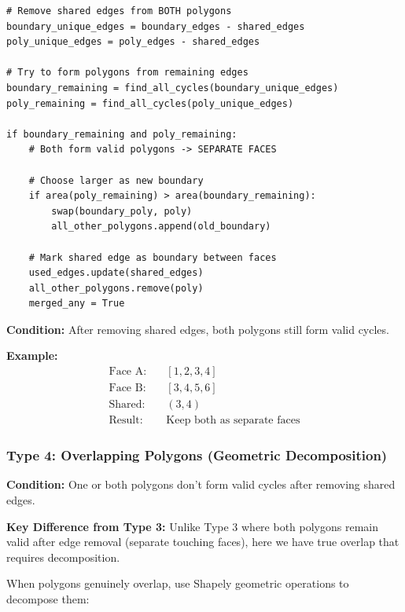 \documentclass[11pt]{article}
\begin{document}
\begin{lstlisting}[caption={Two faces sharing an edge},label={lst:touching}]
# Remove shared edges from BOTH polygons
boundary_unique_edges = boundary_edges - shared_edges
poly_unique_edges = poly_edges - shared_edges

# Try to form polygons from remaining edges
boundary_remaining = find_all_cycles(boundary_unique_edges)
poly_remaining = find_all_cycles(poly_unique_edges)

if boundary_remaining and poly_remaining:
    # Both form valid polygons -> SEPARATE FACES
    
    # Choose larger as new boundary
    if area(poly_remaining) > area(boundary_remaining):
        swap(boundary_poly, poly)
        all_other_polygons.append(old_boundary)
    
    # Mark shared edge as boundary between faces
    used_edges.update(shared_edges)
    all_other_polygons.remove(poly)
    merged_any = True
\end{lstlisting}

\textbf{Condition:} After removing shared edges, both polygons still form valid cycles.

\textbf{Example:}
\begin{align*}
\text{Face A:} &\quad [1,2,3,4] \\
\text{Face B:} &\quad [3,4,5,6] \\
\text{Shared:} &\quad (3,4) \\
\text{Result:} &\quad \text{Keep both as separate faces}
\end{align*}

\subsubsection{Type 4: Overlapping Polygons (Geometric Decomposition)}

\textbf{Condition:} One or both polygons don't form valid cycles after removing shared edges.

\textbf{Key Difference from Type 3:} Unlike Type 3 where both polygons remain valid after edge removal (separate touching faces), here we have true overlap that requires decomposition.

When polygons genuinely overlap, use Shapely geometric operations to decompose them:
\end{document}
